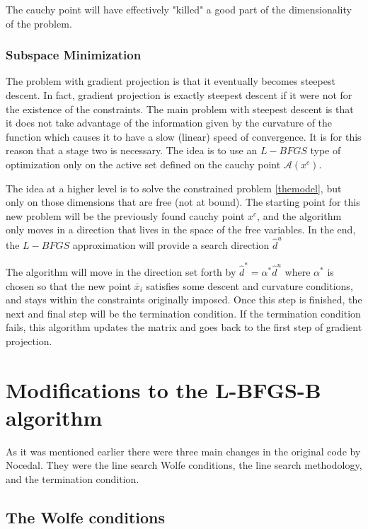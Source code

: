The cauchy point will have effectively "killed" a good part of the dimensionality of the problem.

\subsection{Subspace Minimization}

The problem with gradient projection is that it eventually becomes steepest descent. In fact, gradient projection is exactly steepest descent if it were not for the existence of the constraints. The main problem with steepest descent is that it does not take advantage of the information given by the curvature of the function which causes it to have a slow (linear) speed of convergence. It is for this reason that a stage two is necessary. The idea is to use an $L-BFGS$ type of optimization only on the active set defined on the cauchy point $\mathcal{A}(x^c)$.

The idea at a higher level is to solve the constrained problem \ref{themodel}, but only on those dimensions that are free (not at bound). The starting point for this new problem will be the previously found cauchy point $x^c$, and the algorithm only moves in a direction that lives in the space of the free variables. In the end, the $L-BFGS$ approximation will provide a search direction $\hat{d}^u$

The algorithm will move in the direction set forth by $\hat{d}^* = \alpha^* \hat{d}^u$ where $\alpha^*$ is chosen so that the new point $\bar{x}_i$ satisfies some descent and curvature conditions, and stays within the constraints originally imposed. Once this step is finished, the next and final step will be the termination condition. If the termination condition fails, this algorithm updates the matrix and goes back to the first step of gradient projection.

\chapter{Modifications to the L-BFGS-B algorithm}

As it was mentioned earlier there were three main changes in the original code by Nocedal\citep{lbfgsbsoftware}. They were the line search Wolfe conditions, the line search methodology, and the termination condition.

\section{The Wolfe conditions}

